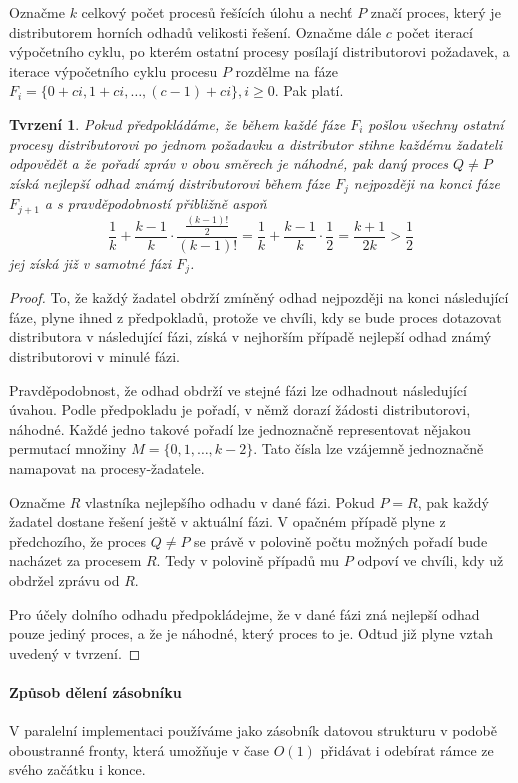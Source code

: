\documentclass[12pt]{article}
\newtheorem{tvrz}{Tvrzení}
\theoremstyle{definition}
\begin{document}
	Označme $k$ celkový počet procesů řešících úlohu a nechť $P$ značí proces, který je distributorem horních
	odhadů velikosti řešení. Označme dále $c$ počet iterací výpočetního cyklu, po kterém ostatní
	procesy posílají distributorovi požadavek, a iterace výpočetního cyklu
	procesu $P$ rozdělme na fáze $F_i=\{0+ci, 1+ci, \dots, (c-1)+ci\},i\geq 0$.
	Pak platí.
\begin{tvrz}
	Pokud předpokládáme, že během každé fáze $F_i$ pošlou všechny ostatní procesy distributorovi po jednom požadavku a distributor stihne
	každému žadateli odpovědět a že pořadí zpráv v obou směrech je náhodné, pak
	daný proces $Q\neq P$ získá nejlepší odhad známý distributorovi během fáze $F_j$ nejpozději na konci fáze $F_{j+1}$ a
	s pravděpodobností přibližně aspoň
	$$\frac{1}{k}+\frac{k-1}{k}\cdot\frac{\frac{(k-1)!}{2}}{(k-1)!}=\frac{1}{k}+\frac{k-1}{k}\cdot\frac{1}{2}
	=\frac{k+1}{2k}>\frac{1}{2}$$
	jej získá již v samotné fázi $F_j$.
\end{tvrz}
\begin{proof}
	To, že každý žadatel obdrží zmíněný odhad nejpozději na konci následující fáze, plyne ihned z předpokladů, protože ve chvíli,
	kdy se bude proces dotazovat distributora v následující fázi, získá v nejhorším případě nejlepší odhad známý
	distributorovi v minulé fázi.
	
	Pravděpodobnost, že odhad obdrží ve stejné fázi lze odhadnout následující úvahou.
	Podle předpokladu je pořadí, v němž dorazí žádosti distributorovi, náhodné. Každé jedno takové pořadí
	lze jednoznačně representovat nějakou permutací množiny $M=\{0,1,\dots, k-2\}$. Tato čísla
	lze vzájemně jednoznačně namapovat na procesy-žadatele.
	
	Označme $R$ vlastníka nejlepšího odhadu v dané fázi. Pokud $P=R$, pak každý žadatel dostane řešení ještě
	v aktuální fázi. V opačném případě plyne z předchozího,
	že proces $Q\neq P$ se právě v polovině počtu možných pořadí bude nacházet za procesem $R$.
	Tedy v polovině případů mu $P$ odpoví ve chvíli, kdy už obdržel zprávu od $R$.
	
	Pro účely dolního odhadu předpokládejme, že v dané fázi zná nejlepší odhad pouze jediný proces, a že
	je náhodné, který proces to je. Odtud již plyne vztah uvedený v tvrzení.
\end{proof}

\paragraph{Způsob dělení zásobníku}
V paralelní implementaci používáme jako zásobník datovou strukturu v podobě oboustranné fronty, která umožňuje v čase $O(1)$ přidávat i odebírat
rámce ze svého začátku i konce.
\end{document}
